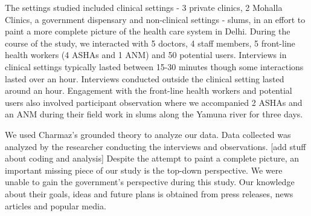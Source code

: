 The settings studied included clinical settings - 3 private clinics, 2 Mohalla Clinics, a government dispensary and non-clinical settings - slums, in an effort to paint a more complete picture of the health care system in Delhi. During the course of the study, we interacted with 5 doctors, 4 staff members, 5 front-line health workers (4 ASHAs and 1 ANM) and 50 potential users. Interviews in clinical settings typically lasted between 15-30 minutes though some interactions lasted over an hour. Interviews conducted outside the clinical setting lasted around an hour. Engagement with the front-line health workers and potential users also involved participant observation where we accompanied 2 ASHAs and an ANM during their field work in slums along the Yamuna river for three days.

We used Charmaz's grounded theory to analyze our data. Data collected was analyzed by the researcher conducting the interviews and observations. [add stuff about coding and analysis] Despite the attempt to paint a complete picture, an important missing piece of our study is the top-down perspective. We were unable to gain the government's perspective during this study. Our knowledge about their goals, ideas and future plans is obtained from press releases, news articles and popular media. %